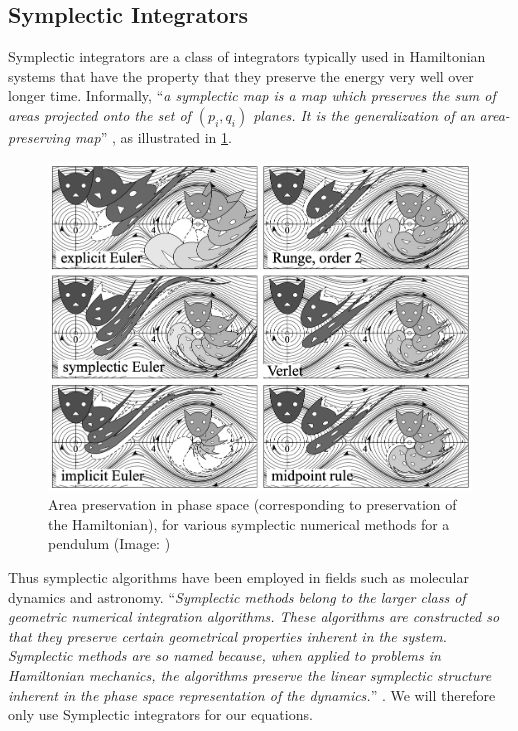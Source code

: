 \subsection{Symplectic Integrators}
Symplectic integrators are a class of integrators typically used in Hamiltonian systems that have the property that they preserve the energy very well over longer time. Informally, ``\textit{a symplectic map is a map which preserves the sum of areas projected onto the set of $(p_i,q_i)$ planes. It is the generalization of an area-preserving map}'' \cite{Weisstein}, as illustrated in \cref{fig:symplectic-area}.

\begin{figure}[ht]
    \centering
    \includegraphics[width=0.90\linewidth]{fig/symplectic-area.png}
    \caption{Area preservation in phase space (corresponding to preservation of the Hamiltonian), for various symplectic numerical methods for a pendulum (Image: \cite{Hairer})}
    \label{fig:symplectic-area}
\end{figure}

Thus symplectic algorithms have been employed in fields such as molecular dynamics and astronomy. ``\textit{Symplectic methods belong to the larger class of geometric numerical integration algorithms. These algorithms are constructed so that they preserve certain geometrical properties inherent in the system. Symplectic methods are so named because, when applied to problems in Hamiltonian mechanics, the algorithms preserve the linear symplectic structure inherent in the phase space representation of the dynamics.}'' \cite{Donnelly2005}. We will therefore only use Symplectic integrators for our equations.


